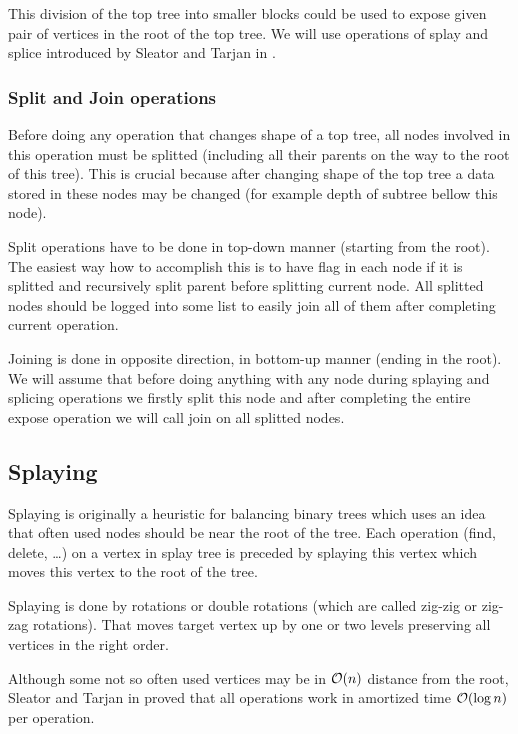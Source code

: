 This division of the top tree into smaller blocks could be used to expose given
pair of vertices in the root of the top tree. We will use operations of
{\I splay} and {\I splice} introduced by Sleator and Tarjan in
\cite{SelfAdjustingBST}.

\subsubsection{Split and Join operations}

Before doing any operation that changes shape of a top tree, all nodes involved
in this operation must be splitted (including all their parents on the way to the root
of this tree). This is crucial because after changing shape of the top tree
a data stored in these nodes may be changed (for example depth of subtree bellow
this node).

Split operations have to be done in top-down manner (starting from the root). The
easiest way how to accomplish this is to have flag in each node if it is
splitted and recursively split parent before splitting current node. All
splitted nodes should be logged into some list to easily join all of them after
completing current operation.

Joining is done in opposite direction, in bottom-up manner (ending in the root).
We will assume that before doing anything with any node during splaying and
splicing operations we firstly split this node and after completing the entire
expose operation we will call join on all splitted nodes.

\subsection{Splaying}

Splaying is originally a heuristic for balancing binary trees which uses an idea
that often used nodes should be near the root of the tree. Each operation (find,
delete, \dots) on a vertex in splay tree is preceded by splaying this vertex
which moves this vertex to the root of the tree.

Splaying is done by rotations or double rotations (which are called {\I zig-zig}
or {\I zig-zag} rotations). That moves target vertex up by one or two levels
preserving all vertices in the right order.

Although some not so often used vertices may be in ${\cal O}(n)$ distance from the
root, Sleator and Tarjan in \cite{SelfAdjustingBST} proved that all operations
work in amortized time ${\cal O}(\log n)$ per operation.

